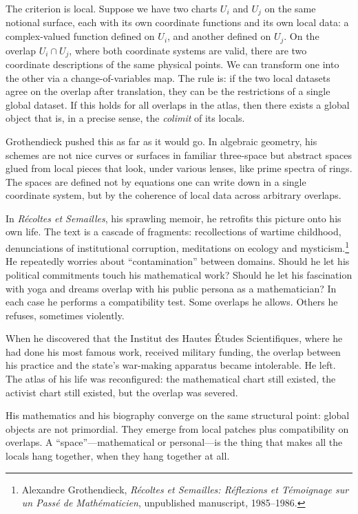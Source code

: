 \documentclass[12pt,a4paper]{article}
\begin{document}
The criterion is local. Suppose we have two charts $U_i$ and $U_j$ on the same notional surface, each with its own coordinate functions and its own local data: a complex-valued function defined on $U_i$, and another defined on $U_j$. On the overlap $U_i \cap U_j$, where both coordinate systems are valid, there are two coordinate descriptions of the same physical points. We can transform one into the other via a change-of-variables map. The rule is: if the two local datasets agree on the overlap after translation, they can be the restrictions of a single global dataset. If this holds for all overlaps in the atlas, then there exists a global object that is, in a precise sense, the \emph{colimit} of its locals.

Grothendieck pushed this as far as it would go. In algebraic geometry, his schemes are not nice curves or surfaces in familiar three-space but abstract spaces glued from local pieces that look, under various lenses, like prime spectra of rings. The spaces are defined not by equations one can write down in a single coordinate system, but by the coherence of local data across arbitrary overlaps.

In \emph{R\'ecoltes et Semailles}, his sprawling memoir, he retrofits this picture onto his own life. The text is a cascade of fragments: recollections of wartime childhood, denunciations of institutional corruption, meditations on ecology and mysticism.\footnote{Alexandre Grothendieck, \emph{R\'ecoltes et Semailles: R\'eflexions et T\'emoignage sur un Pass\'e de Math\'ematicien}, unpublished manuscript, 1985--1986.} He repeatedly worries about ``contamination'' between domains. Should he let his political commitments touch his mathematical work? Should he let his fascination with yoga and dreams overlap with his public persona as a mathematician? In each case he performs a compatibility test. Some overlaps he allows. Others he refuses, sometimes violently.

When he discovered that the Institut des Hautes \'Etudes Scientifiques, where he had done his most famous work, received military funding, the overlap between his practice and the state's war-making apparatus became intolerable. He left. The atlas of his life was reconfigured: the mathematical chart still existed, the activist chart still existed, but the overlap was severed.

His mathematics and his biography converge on the same structural point: global objects are not primordial. They emerge from local patches plus compatibility on overlaps. A ``space''---mathematical or personal---is the thing that makes all the locals hang together, when they hang together at all.
\end{document}

